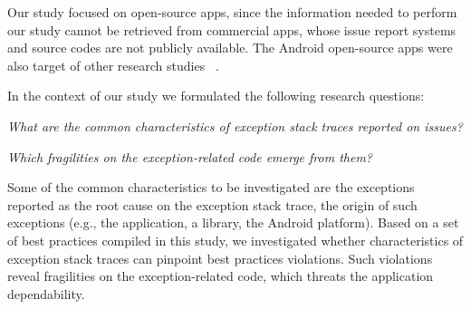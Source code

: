 \documentclass[conference]{IEEEtran}
\begin{document}
Our study focused on open-source apps, since the information needed to perform our study
cannot be retrieved from commercial apps, whose issue report systems and 
source codes are not publicly available. The Android open-source apps were also 
target of other research studies ~\cite{Linar13,ahimed}.   


In the context of our study we formulated the following research questions:

\begin{description}

  \item[RQ1] \noindent\emph{What are the common characteristics of exception stack traces reported on issues?} 


     \item

  \item[RQ2] \noindent\emph{Which fragilities on the exception-related code emerge from them?}


\end{description}



Some of the common characteristics to be investigated are the exceptions reported as the root cause on
the exception stack trace, the origin of such exceptions (e.g., the application, a library, the Android platform). 
Based on a set of best practices compiled in this study, we investigated 
whether characteristics of exception stack traces can pinpoint best practices violations. 
Such  violations reveal fragilities
on the exception-related code, which threats the application dependability.
\end{document}

